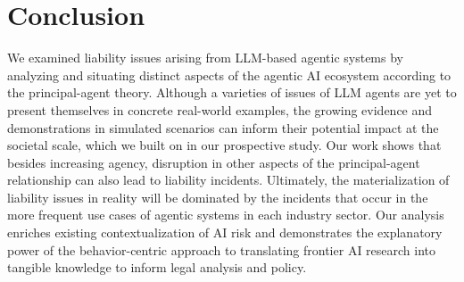 \documentclass[11pt]{article}
\begin{document}
\section{Conclusion}

We examined liability issues arising from LLM-based agentic systems by analyzing and situating distinct aspects of the agentic AI ecosystem according to the principal-agent theory. Although a varieties of issues of LLM agents are yet to present themselves in concrete real-world examples, the growing evidence and demonstrations in simulated scenarios can inform their potential impact at the societal scale, which we built on in our prospective study. Our work shows that besides increasing agency, disruption in other aspects of the principal-agent relationship can also lead to liability incidents. Ultimately, the materialization of liability issues in reality will be dominated by the incidents that occur in the more frequent use cases of agentic systems in each industry sector. Our analysis enriches existing contextualization of AI risk \citep{chan_harms_2023,hammond_multiagent_2025} and demonstrates the explanatory power of the behavior-centric approach to translating frontier AI research into tangible knowledge to inform legal analysis and policy.





\end{document}
